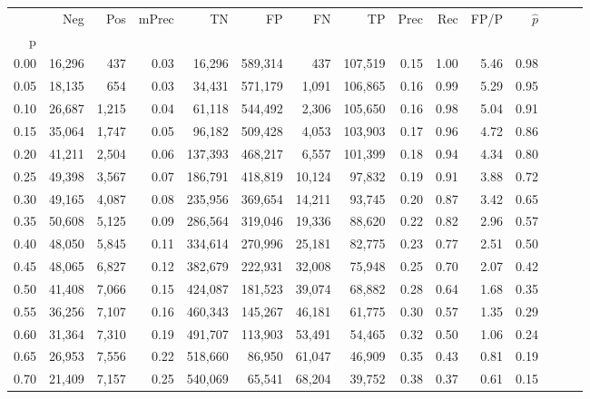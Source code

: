 \begin{tabular}{rrrrrrrrrrrrrrr}
\toprule
{} &     Neg &    Pos & mPrec &       TN &       FP &       FN &       TP &  Prec &   Rec &  FP/P & $\hat{p}$ \\
p    &         &        &       &          &          &          &          &       &       &       &           \\
\midrule
0.00 &  16,296 &    437 &  0.03 &   16,296 &  589,314 &      437 &  107,519 &  0.15 &  1.00 &  5.46 &      0.98 \\
0.05 &  18,135 &    654 &  0.03 &   34,431 &  571,179 &    1,091 &  106,865 &  0.16 &  0.99 &  5.29 &      0.95 \\
0.10 &  26,687 &  1,215 &  0.04 &   61,118 &  544,492 &    2,306 &  105,650 &  0.16 &  0.98 &  5.04 &      0.91 \\
0.15 &  35,064 &  1,747 &  0.05 &   96,182 &  509,428 &    4,053 &  103,903 &  0.17 &  0.96 &  4.72 &      0.86 \\
0.20 &  41,211 &  2,504 &  0.06 &  137,393 &  468,217 &    6,557 &  101,399 &  0.18 &  0.94 &  4.34 &      0.80 \\
0.25 &  49,398 &  3,567 &  0.07 &  186,791 &  418,819 &   10,124 &   97,832 &  0.19 &  0.91 &  3.88 &      0.72 \\
0.30 &  49,165 &  4,087 &  0.08 &  235,956 &  369,654 &   14,211 &   93,745 &  0.20 &  0.87 &  3.42 &      0.65 \\
0.35 &  50,608 &  5,125 &  0.09 &  286,564 &  319,046 &   19,336 &   88,620 &  0.22 &  0.82 &  2.96 &      0.57 \\
0.40 &  48,050 &  5,845 &  0.11 &  334,614 &  270,996 &   25,181 &   82,775 &  0.23 &  0.77 &  2.51 &      0.50 \\
0.45 &  48,065 &  6,827 &  0.12 &  382,679 &  222,931 &   32,008 &   75,948 &  0.25 &  0.70 &  2.07 &      0.42 \\
0.50 &  41,408 &  7,066 &  0.15 &  424,087 &  181,523 &   39,074 &   68,882 &  0.28 &  0.64 &  1.68 &      0.35 \\
0.55 &  36,256 &  7,107 &  0.16 &  460,343 &  145,267 &   46,181 &   61,775 &  0.30 &  0.57 &  1.35 &      0.29 \\
0.60 &  31,364 &  7,310 &  0.19 &  491,707 &  113,903 &   53,491 &   54,465 &  0.32 &  0.50 &  1.06 &      0.24 \\
0.65 &  26,953 &  7,556 &  0.22 &  518,660 &   86,950 &   61,047 &   46,909 &  0.35 &  0.43 &  0.81 &      0.19 \\
0.70 &  21,409 &  7,157 &  0.25 &  540,069 &   65,541 &   68,204 &   39,752 &  0.38 &  0.37 &  0.61 &      0.15 \\

\end{tabular}
